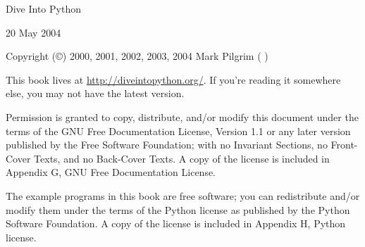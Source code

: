\maketitle

\begin{titlepage}

Dive Into Python
\bigskip

20 May 2004
\bigskip

Copyright (\copyright) 2000, 2001, 2002, 2003, 2004 Mark Pilgrim (
)
\bigskip

This book lives at \url{http://diveintopython.org/}. If you're reading it
somewhere else, you may not have the latest version.
\bigskip

Permission is granted to copy, distribute, and/or modify this document under
the terms of the GNU Free Documentation License, Version 1.1 or any later
version published by the Free Software Foundation; with no Invariant Sections,
no Front-Cover Texts, and no Back-Cover Texts. A copy of the license is
included in Appendix G, GNU Free Documentation License.
\bigskip

The example programs in this book are free software; you can redistribute 
and/or modify them under the terms of the Python license as published by the Python
Software Foundation. A copy of the license is included in Appendix H, Python
license.

\end{titlepage}
